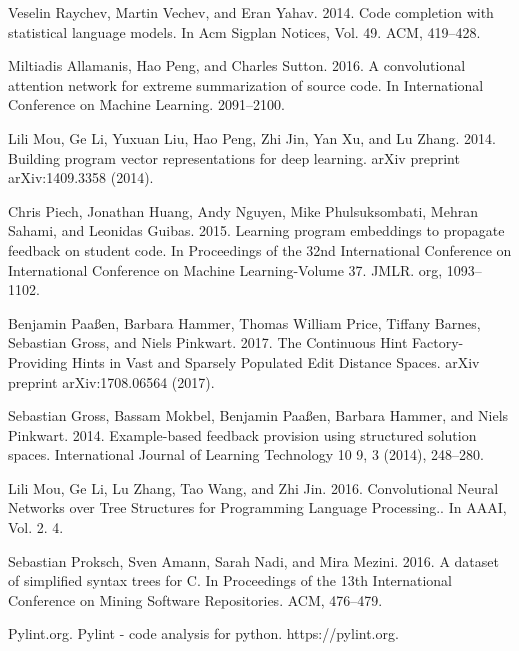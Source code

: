 \documentclass[conference]{IEEEtran}
\begin{document}
\begin{thebibliography}{99}
 Veselin Raychev, Martin Vechev, and Eran Yahav. 2014. Code completion with statistical language models. In Acm Sigplan Notices, Vol. 49. ACM, 419–428.

 Miltiadis Allamanis, Hao Peng, and Charles Sutton. 2016. A convolutional attention network for extreme summarization of source code. In International Conference on Machine Learning. 2091–2100.


 Lili Mou, Ge Li, Yuxuan Liu, Hao Peng, Zhi Jin, Yan Xu, and Lu Zhang. 2014. Building program vector representations for deep learning. arXiv preprint arXiv:1409.3358 (2014).

 Chris Piech, Jonathan Huang, Andy Nguyen, Mike Phulsuksombati, Mehran Sahami, and Leonidas Guibas. 2015. Learning program embeddings to propagate feedback on student code. In Proceedings of the 32nd International Conference on International Conference on Machine Learning-Volume 37. JMLR. org, 1093–1102.

 Benjamin Paaßen, Barbara Hammer, Thomas William Price, Tiffany Barnes, Sebastian Gross, and Niels Pinkwart. 2017. The Continuous Hint Factory-Providing Hints in Vast and Sparsely Populated Edit Distance Spaces. arXiv preprint arXiv:1708.06564 (2017).


 Sebastian Gross, Bassam Mokbel, Benjamin Paaßen, Barbara Hammer, and Niels Pinkwart. 2014. Example-based feedback provision using structured solution spaces. International Journal of Learning Technology 10 9, 3 (2014), 248–280.

 Lili Mou, Ge Li, Lu Zhang, Tao Wang, and Zhi Jin. 2016. Convolutional Neural Networks over Tree Structures for Programming Language Processing.. In AAAI, Vol. 2. 4.

 Sebastian Proksch, Sven Amann, Sarah Nadi, and Mira Mezini. 2016. A dataset of simplified syntax trees for C. In Proceedings of the 13th International Conference on Mining Software Repositories. ACM, 476–479.

 Pylint.org. Pylint - code analysis for python. https://pylint.org.

\end{thebibliography}
\end{document}
